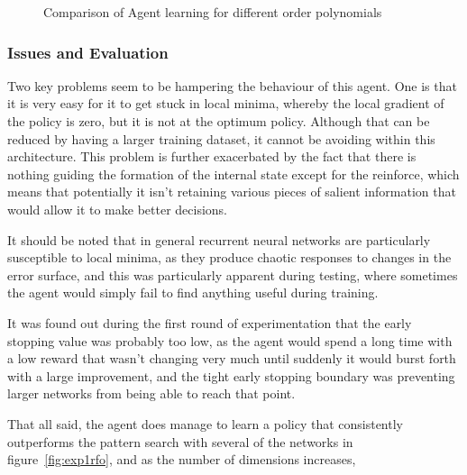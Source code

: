 \begin{figure}
\centering

\caption{Comparison of Agent learning for different order polynomials}
\label{fig:exp2parrfo}
\end{figure}

\subsubsection{Issues and Evaluation} %


Two key problems seem to be hampering the behaviour of this agent. One is that it is very easy for it to get stuck in local minima, whereby the local gradient of the policy is zero, but it is not at the optimum policy. Although that can be reduced by having a larger training dataset, it cannot be avoiding within this architecture. This problem is further exacerbated by the fact that there is nothing guiding the formation of the internal state except for the reinforce, which means that potentially it isn't retaining various pieces of salient information that would allow it to make better decisions.

It should be noted that in general recurrent neural networks are particularly susceptible to local minima, as they produce chaotic responses to changes in the error surface\cite{Cuéllar2006}, and this was particularly apparent during testing, where sometimes the agent would simply fail to find anything useful during training. %

It was found out during the first round of experimentation that the early stopping value was probably too low, as the agent would spend a long time with a low reward that wasn't changing very much until suddenly it would burst forth with a large improvement, and the tight early stopping boundary was preventing larger networks from being able to reach that point.

That all said, the agent does manage to learn a policy that consistently outperforms the pattern search with several of the networks in figure~\ref{fig:exp1rfo}, and as the number of dimensions increases, %

